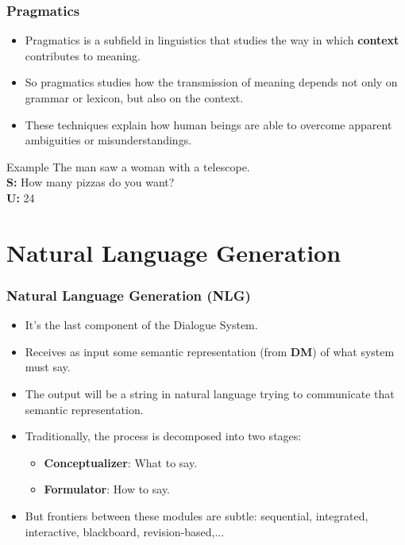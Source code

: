 \documentclass[11pt]{beamer}
\begin{document}
\begin{frame}[noframenumbering]
\frametitle{Pragmatics}
	\begin{itemize}
		\item Pragmatics is a subfield in linguistics that studies the way in which \textbf{context} contributes to meaning.
		\item So pragmatics studies how the transmission of meaning depends not only on grammar or lexicon, but also on the context.
		\item These techniques explain how human beings are able to overcome apparent ambiguities or misunderstandings.
	\end{itemize}
	\begin{block}{Example}
		\vspace{10pt}
		The man saw a woman with a telescope.\\
		\vspace{10pt}
		\textbf{S:} How many pizzas do you want?\\
		\textbf{U:} 24  \\
		\vspace{10pt}
	\end{block}
\end{frame}

\section{Natural Language Generation}

\begin{frame}
\frametitle{Natural Language Generation (\textbf{NLG})}
	\begin{itemize}
		\item It's the last component of the Dialogue System.
		\pause
		\item Receives as input some semantic representation (from \textbf{DM}) of what system must say.
		\pause
		\item The output will be a string in natural language trying to communicate that semantic representation.
		\pause
		\item Traditionally, the process is decomposed into two stages:
		\begin{itemize}
			\item \textbf{Conceptualizer}: What to say.
			\item \textbf{Formulator}: How to say.
		\end{itemize}
		\pause
		\item But frontiers between these modules are subtle: sequential, integrated, interactive, blackboard, revision-based,...
	\end{itemize}
\end{frame}
\end{document}
